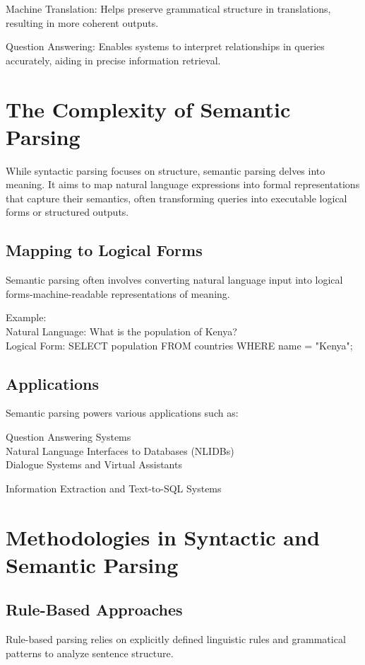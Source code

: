 \documentclass[10pt]{article}
\begin{document}
Machine Translation: Helps preserve grammatical structure in translations, resulting in more coherent outputs.

Question Answering: Enables systems to interpret relationships in queries accurately, aiding in precise information retrieval.

\section*{The Complexity of Semantic Parsing}
While syntactic parsing focuses on structure, semantic parsing delves into meaning. It aims to map natural language expressions into formal representations that capture their semantics, often transforming queries into executable logical forms or structured outputs.

\subsection*{Mapping to Logical Forms}
Semantic parsing often involves converting natural language input into logical forms-machine-readable representations of meaning.

Example:\\
Natural Language: What is the population of Kenya?\\
Logical Form: SELECT population FROM countries WHERE name = "Kenya";

\subsection*{Applications}
Semantic parsing powers various applications such as:

Question Answering Systems\\
Natural Language Interfaces to Databases (NLIDBs)\\
Dialogue Systems and Virtual Assistants

Information Extraction and Text-to-SQL Systems

\section*{Methodologies in Syntactic and Semantic Parsing}
\subsection*{Rule-Based Approaches}
Rule-based parsing relies on explicitly defined linguistic rules and grammatical patterns to analyze sentence structure.
\end{document}
